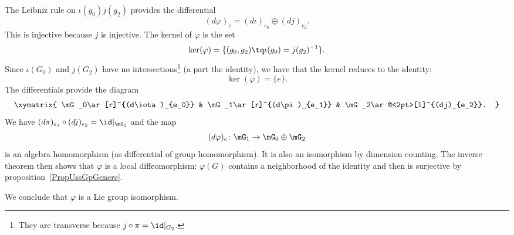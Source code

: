 The Leibniz rule on $\iota(g_0)j(g_2)$ provides the differential
\begin{equation}
	(d\varphi)_e=(d\iota)_{e_0}\oplus(dj)_{e_2}.
\end{equation}
This is injective because $j$ is injective. The kernel of $\varphi$ is the set
\begin{equation}
	\ker(\varphi)=\{ (g_0,g_2)\tq \iota(g_0)=j(g_2)^{-1} \}.
\end{equation}
Since $\iota(G_0)$ and $j(G_2)$ have no intersections\footnote{They are transverse because $j\circ \pi=\id|_{G_2}$.} (a part the identity), we have that the kernel reduces to the identity:
\begin{equation}
	\ker(\varphi)=\{ e \}.
\end{equation}
The differentials provide the diagram
\begin{equation}
	\xymatrix{
	\mG_0\ar[r]^{(d\iota)_{e_0}}    &   \mG_1\ar[r]^{(d\pi)_{e_1}}  &   \mG_2\ar@<2pt>[l]^{(dj)_{e_2}}.
	}
\end{equation}
We have $(d\pi)_{e_1}\circ (dj)_{e_2}=\id|_{\mG_2}$ and the map
\begin{equation}
	(d\varphi)_e\colon \mG_1\to \mG_0\oplus\mG_2
\end{equation}
is an algebra homomorphism (as differential of group homomorphism). It is also an isomorphism by dimension counting. The inverse theorem then shows that $\varphi$ is a local diffeomorphism: $\varphi(G)$ contains a neighborhood of the identity and then is surjective by proposition~\ref{PropUssGpGenere}.

We conclude that $\varphi$ is a Lie group isomorphism.

